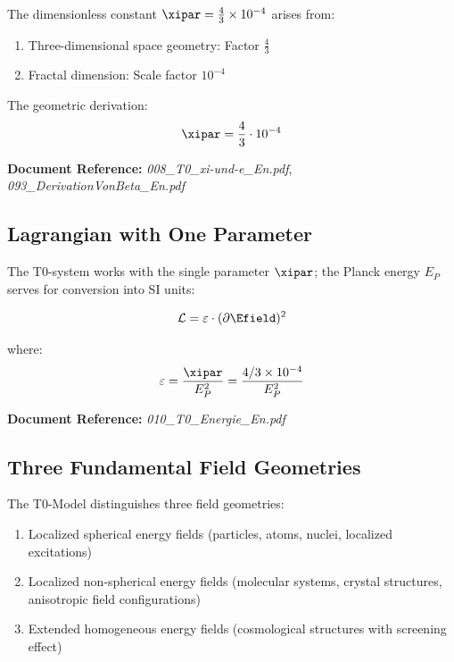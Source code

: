 The dimensionless constant $\xipar = \frac{4}{3} \times 10^{-4}$ arises from:

\begin{enumerate}
	\item Three-dimensional space geometry: Factor $\frac{4}{3}$
	\item Fractal dimension: Scale factor $10^{-4}$
\end{enumerate}

The geometric derivation:
\begin{equation}
	\xipar = \frac{4}{3} \cdot 10^{-4}
\end{equation}

\textbf{Document Reference:} \textit{008\_T0\_xi-und-e\_En.pdf}, \textit{093\_DerivationVonBeta\_En.pdf}

\subsection{Lagrangian with One Parameter}

The T0-system works with the single parameter $\xipar$; the Planck energy $E_P$ serves for conversion into SI units:

\begin{equation}
	\mathcal{L} = \varepsilon \cdot (\partial \Efield)^2
\end{equation}

where:
\begin{equation}
	\varepsilon = \frac{\xipar}{E_P^2} = \frac{4/3 \times 10^{-4}}{E_P^2}
\end{equation}

\textbf{Document Reference:} \textit{010\_T0\_Energie\_En.pdf}

\subsection{Three Fundamental Field Geometries}

The T0-Model distinguishes three field geometries:

\begin{enumerate}
	\item Localized spherical energy fields (particles, atoms, nuclei, localized excitations)
	\item Localized non-spherical energy fields (molecular systems, crystal structures, anisotropic field configurations)
	\item Extended homogeneous energy fields (cosmological structures with screening effect)
\end{enumerate}


